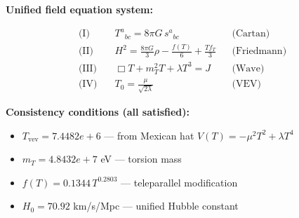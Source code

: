 
\textbf{Unified field equation system:}

\begin{align}
  \text{(I)} \quad & T^a{}_{bc} = 8\pi G \, s^a{}_{bc} && \text{(Cartan)} \\
  \text{(II)} \quad & H^2 = \frac{8\pi G}{3}\rho - \frac{f(T)}{6} + \frac{Tf_T}{3} && \text{(Friedmann)} \\
  \text{(III)} \quad & \Box T + m_T^2 T + \lambda T^3 = J && \text{(Wave)} \\
  \text{(IV)} \quad & T_0 = \frac{\mu}{\sqrt{2\lambda}} && \text{(VEV)}
\end{align}

\textbf{Consistency conditions (all satisfied):}
\begin{itemize}
  \item $T_{\text{vev}} = 7.4482e+6$ — from Mexican hat $V(T) = -\mu^2 T^2 + \lambda T^4$
  \item $m_T = 4.8432e+7$ eV — torsion mass
  \item $f(T) = 0.1344 \, T^{0.2803}$ — teleparallel modification
  \item $H_0 = 70.92$ km/s/Mpc — unified Hubble constant
\end{itemize}